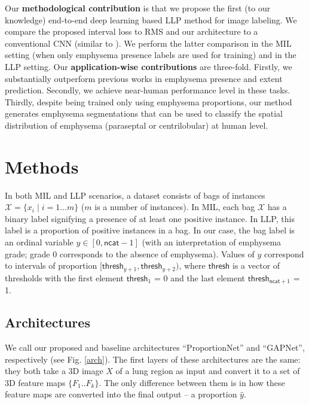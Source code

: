 \documentclass{llncs}
\begin{document}
Our \textbf{methodological contribution} is that we propose the first (to our knowledge) end-to-end deep learning based LLP method for image labeling.
We compare the proposed interval loss to RMS and our architecture to a conventional CNN (similar to \cite{Dubost2017,He2016}).
We perform the latter comparison in the MIL setting (when only emphysema presence labels are used for training) and in the LLP setting.
Our \textbf{application-wise contributions} are three-fold.
Firstly, we substantially outperform previous works \cite{Silas2016,Silas2018} in emphysema presence and extent prediction.
Secondly, we achieve near-human performance level in these tasks.
Thirdly, despite being trained only using emphysema proportions, our method generates emphysema segmentations that can be used to classify the spatial distribution of emphysema (paraseptal or centrilobular) at human level.


\section{Methods}

In both MIL and LLP scenarios, a dataset consists of bags of instances $\mathcal{X} = \{ x_{i} \mid i = 1...m \}$ ($m$ is a number of instances).
In MIL, each bag $\mathcal{X}$ has a binary label signifying a presence of at least one positive instance.
In LLP, this label is a proportion of positive instances in a bag.
In our case, the bag label is an ordinal variable $y \in [0, \textsf{ncat} - 1]$ (with an interpretation of emphysema grade; grade 0 corresponds to the absence of emphysema).
Values of $y$ correspond to intervals of proportion $[\textsf{thresh}_{y+1}, \textsf{thresh}_{y+2})$,
where $\textsf{thresh}$ is a vector of thresholds with the first element $\textsf{thresh}_1$ = 0 and the last element $\textsf{thresh}_{\textsf{ncat}+1}$ = 1.

\subsection{Architectures}\label{architecture}

We call our proposed and baseline architectures ``ProportionNet'' and ``GAPNet'', respectively (see Fig. \ref{arch}).
The first layers of these architectures are the same: they both take a 3D image $X$ of a lung region as input and convert it to a set of 3D feature maps $\{F_1..F_k\}$.
The only difference between them is in how these feature maps are converted into the final output -- a proportion $\hat{y}$.
\end{document}
